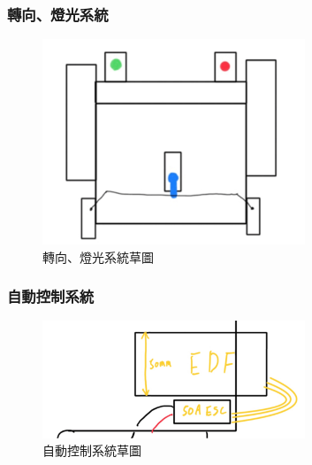 \documentclass[12pt]{article}       %
\begin{document}
\subsubsection{轉向、燈光系統}
\hspace{2em}
\begin{figure}[H]
    \centering
    \includegraphics[width=0.7\textwidth]{4.jpg}     %
    \caption{轉向、燈光系統草圖}    %
    \label{fig:4}    %
\end{figure}

\subsubsection{自動控制系統}
\hspace{2em}
\begin{figure}[H]
    \centering
    \includegraphics[width=0.7\textwidth]{5.jpg}     %
    \caption{自動控制系統草圖}    %
    \label{fig:5}    %
\end{figure}
\end{document}
